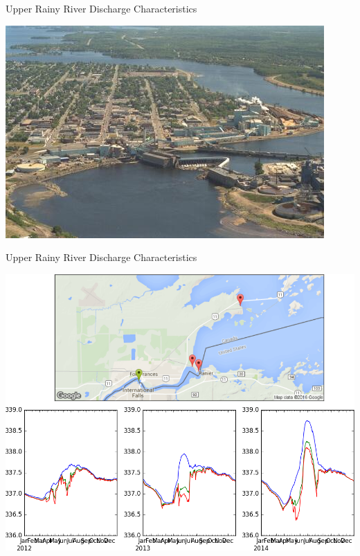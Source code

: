 \documentclass[compress,english]{beamer}
\begin{document}
\begin{frame}{Upper Rainy River Discharge Characteristics}

\begin{center}
\includegraphics[width=0.75\paperwidth]{mill.jpg}
\end{center}

\end{frame} 

\begin{frame}{Upper Rainy River Discharge Characteristics}

\begin{center}
\includegraphics[width=0.75\paperwidth]{RainyRiverConstrictions.png}
\end{center}

\end{frame} 
\end{document}
